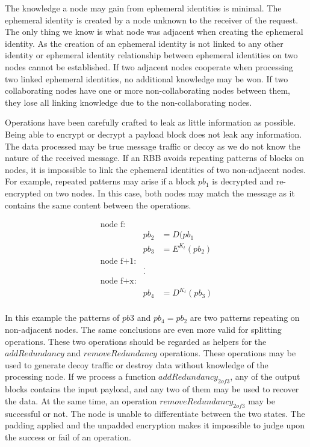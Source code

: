 The knowledge a node may gain from ephemeral identities is minimal. The ephemeral identity is created by a node unknown to the receiver of the request. The only thing we know is what node was adjacent when creating the ephemeral identity. As the creation of an ephemeral identity is not linked to any other identity or ephemeral identity relationship between ephemeral identities on two nodes cannot be established. If two adjacent nodes cooperate when processing two linked ephemeral identities, no additional knowledge may be won. If two collaborating nodes have one or more non-collaborating nodes between them, they lose all linking knowledge due to the non-collaborating nodes. 

Operations have been carefully crafted to leak as little information as possible. Being able to encrypt or decrypt a payload block does not leak any information. The data processed may be true message traffic or decoy as we do not know the nature of the received message. If an RBB avoids repeating patterns of blocks on nodes, it is impossible to link the ephemeral identities of two non-adjacent nodes. For example, repeated patterns may arise if a block $pb_1$ is decrypted and re-encrypted on two nodes. In this case, both nodes may match the message as it contains the same content between the operations.

\begin{eqnarray*}
	\text{node f:}\\
	& pb_2 & = D(pb_1\\
	& pb_3 & = E^{K_t}(pb_2)\\
	\text{node f+1:}\\
	&.\\
	&.\\    
	\text{node f+x:}\\
	& pb_4 & = D^{K_t}(pb_3)\\
\end{eqnarray*}

In this example the patterns of $pb3$ and $pb_4=pb_2$ are two patterns repeating on non-adjacent nodes. The same conclusions are even more valid for splitting operations. These two operations should be regarded as helpers for the $addRedundancy$ and $removeRedundancy$ operations. These operations may be used to generate decoy traffic or destroy data without knowledge of the processing node. If we process a function $addRedundancy_{2 of 3}$, any of the output blocks contains the input payload, and any two of them may be used to recover the data. At the same time, an operation $removeRedundancy_{2 of 3}$ may be successful or not. The node is unable to differentiate between the two states. The padding applied and the unpadded encryption makes it impossible to judge upon the success or fail of an operation.

